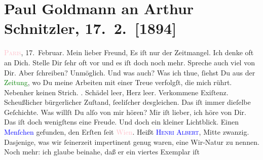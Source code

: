 

               \section[Paul Goldmann an Arthur Schnitzler, 17. 2. {[}1894{]}]{ Paul Goldmann an Arthur Schnitzler, 17. 2. {[}1894{]}}\nopagebreak{}\rehead{ }\normalsize\beginnumbering{} \toendnotes[C]{\smallbreak\pagebreak[2]} 
\toendnotes[C]{\smallbreak}\pstart
           \raggedleft{}{\pb}\textsc{\textcolor{pink}{Paris}{}\ledrightnote{\textcolor{pink}{Paris}}}, 17. Februar.\pend
           \pstart\center{}Mein lieber Freund,\pend\pstart
           Es iſt nur der Zeitmangel. Ich denke oft an Dich. Stelle Dir ſehr oft vor und es iſt
               doch noch mehr. Spreche auch viel von Dir. Aber ſchreiben? Unmöglich. Und was auch?
               Was ich thue, ſiehst Du aus der \textcolor{green}{Zeitung}{}, wo Du meine Arbeiten mit einer Treue verfolgſt, die mich rührt.
               Nebenher keinen Strich. \textsc{\label{K_L02609-12v}\label{K_L02609-12h}}. Schädel
               leer, Herz leer. Verkommene Exiſtenz. Scheußlicher bürgerlicher Zuſtand, ſeeliſcher
               desgleichen. {\pb}Das iſt immer dieſelbe Geſchichte. Was
               willſt Du alſo von mir hören? Mir iſt lieber, ich höre von Dir. Das iſt doch
               wenigſtens eine Freude.\pend
           \pstart
           Und doch ein kleiner Lichtblick. Einen \textcolor{blue}{Menſchen}{} gefunden, den Erſten ſeit \textcolor{pink}{Wien}{}\ledrightnote{\textcolor{pink}{Wien}}. Heißt \textsc{\textcolor{blue}{Henri Albert}{}\ledrightnote{\textcolor{blue}{Henri Albert}}}, Mitte zwanzig. Dasjenige, was wir ſeinerzeit impertinent genug waren, eine
               Wir-Natur zu nennen. Noch mehr: ich glaube beinahe, daß er ein viertes Exemplar iſt

